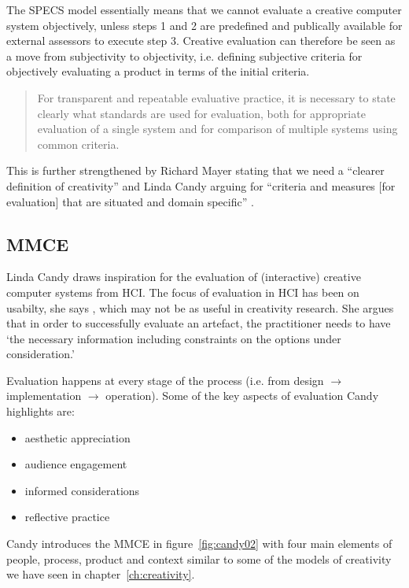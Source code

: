 The \ac{SPECS} model essentially means that we cannot evaluate a creative computer system objectively, unless steps 1 and 2 are predefined and publically available for external assessors to execute step 3. Creative evaluation can therefore be seen as a move from subjectivity to objectivity, i.e. defining subjective criteria for objectively evaluating a product in terms of the initial criteria.

\begin{quotation}
  For transparent and repeatable evaluative practice, it is necessary to state clearly what standards are used for evaluation, both for appropriate evaluation of a single system and for comparison of multiple systems using common criteria. 
\end{quotation}

This is further strengthened by Richard Mayer stating that we need a ``clearer definition of creativity'' \citeyear{Mayer1999} and Linda Candy arguing for ``criteria and measures [for evaluation] that are situated and domain specific'' \citeyear{Candy2012}.


\subsection{MMCE}
\label{s:mmce}

Linda Candy draws inspiration for the evaluation of (interactive) creative computer systems from \ac{HCI}. The focus of evaluation in \ac{HCI} has been on usabilty, she says \citeyear[p.23]{Candy2012}, which may not be as useful in creativity research. She argues that in order to successfully evaluate an artefact, the practitioner needs to have `the necessary information including constraints on the options under consideration.' \autocite[p.7]{Candy2012}

Evaluation happens at every stage of the process (i.e. from design $\to$ implementation $\to$ operation). Some of the key aspects of evaluation Candy highlights are:

\begin{itemize}
  \item aesthetic appreciation
  \item audience engagement
  \item informed considerations
  \item reflective practice
\end{itemize}

Candy introduces the \ac{MMCE} in figure~\ref{fig:candy02} with four main elements of people, process, product and context \citeyear[p.11]{Candy2012} similar to some of the models of creativity we have seen in chapter~\ref{ch:creativity}.

